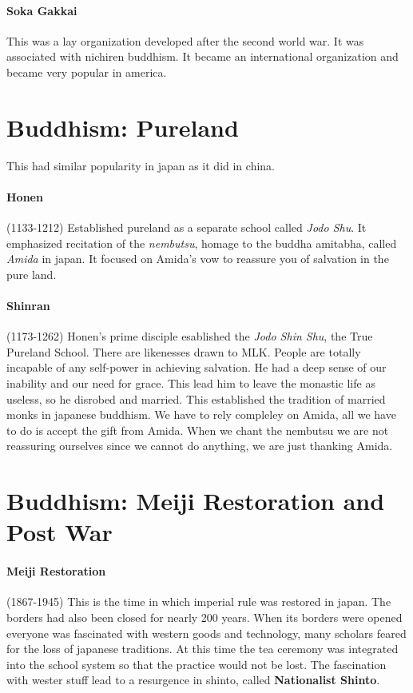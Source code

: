 \documentclass{article}
\begin{document}
\paragraph{Soka Gakkai}
\label{par:soka_gakkai}
This was a lay organization developed after the second world war. It was associated with nichiren buddhism. It became an international organization and became very popular in america.

\section*{Buddhism: Pureland}
\label{sec:buddhism_pureland}
This had similar popularity in japan as it did in china.

\paragraph{Honen}
\label{par:honen}
(1133-1212) Established pureland as a separate school called \emph{Jodo Shu}. It emphasized recitation of the \emph{nembutsu}, homage to the buddha amitabha, called \emph{Amida} in japan. It focused on Amida's vow to reassure you of salvation in the pure land.

\paragraph{Shinran}
\label{par:shinran}
(1173-1262) Honen's prime disciple esablished the \emph{Jodo Shin Shu}, the True Pureland School. There are likenesses drawn to MLK. People are totally incapable of any self-power in achieving salvation. He had a deep sense of our inability and our need for grace. This lead him to leave the monastic life as useless, so he disrobed and married. This established the tradition of married monks in japanese buddhism. We have to rely compleley on Amida, all we have to do is accept the gift from Amida. When we chant the nembutsu we are not reassuring ourselves since we cannot do anything, we are just thanking Amida.

\section*{Buddhism: Meiji Restoration and Post War}
\label{sec:buddhism_meiji_restoration_and_post_war}
\paragraph{Meiji Restoration}
\label{par:meiji_restoration}
(1867-1945) This is the time in which imperial rule was restored in japan. The borders had also been closed for nearly 200 years. When its borders were opened everyone was fascinated with western goods and technology, many scholars feared for the loss of japanese traditions. At this time the tea ceremony was integrated into the school system so that the practice would not be lost. The fascination with wester stuff lead to a resurgence in shinto, called \textbf{Nationalist Shinto}.
\end{document}

